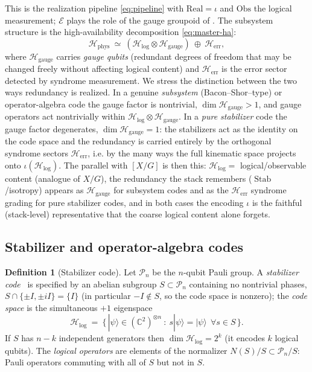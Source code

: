\documentclass[12pt]{article}
\theoremstyle{definition}
\newtheorem{definition}[theorem]{Definition}
\theoremstyle{remark}
\newcommand{\Ho}{\mathcal{H}}
\newcommand{\Hphys}{\Ho_{\mathrm{phys}}}
\newcommand{\Hlog}{\Ho_{\mathrm{log}}}
\newcommand{\Hgauge}{\Ho_{\mathrm{gauge}}}
\newcommand{\Herr}{\Ho_{\mathrm{err}}}
\newcommand{\Real}{\mathrm{Real}}
\newcommand{\Obs}{\mathrm{Obs}}
\newcommand{\Stab}{\operatorname{Stab}}
\newcommand{\quot}[2]{[#1/#2]}
\newcommand{\Pauli}{\mathcal{P}}
\newcommand{\CC}{\mathbb{C}}
\begin{document}
This is the realization pipeline \eqref{eq:pipeline} with $\Real=\iota$ and $\Obs$ the
logical measurement; $\mathcal E$ plays the role of the gauge groupoid of
. The subsystem structure is the high-availability decomposition
\eqref{eq:master-ha}:
\begin{equation}
\Hphys\ \simeq\ (\Hlog\otimes\Hgauge)\ \oplus\ \Herr,
\label{eq:subsystem}
\end{equation}
where $\Hgauge$ carries \emph{gauge qubits} (redundant degrees of freedom that may be
changed freely without affecting logical content) and $\Herr$ is the error sector
detected by syndrome measurement. We stress the distinction between the two ways
redundancy is realized. In a genuine \emph{subsystem} (Bacon--Shor--type) or
operator-algebra code the gauge factor is nontrivial, $\dim\Hgauge>1$, and gauge
operators act nontrivially within $\Hlog\otimes\Hgauge$. In a \emph{pure stabilizer}
code the gauge factor degenerates, $\dim\Hgauge=1$: the stabilizers act as the identity
on the code space and the redundancy is carried entirely by the orthogonal syndrome
sectors $\Herr$, i.e. by the many ways the full kinematic space projects onto
$\iota(\Hlog)$. The parallel with $\quot{X}{G}$ is then this: $\Hlog=$ logical/observable
content (analogue of $X/G$), the redundancy the stack remembers ($\Stab$/isotropy)
appears as $\Hgauge$ for subsystem codes and as the $\Herr$ syndrome grading for pure
stabilizer codes, and in both cases the encoding $\iota$ is the faithful (stack-level)
representative that the coarse logical content alone forgets.

\subsection{Stabilizer and operator-algebra codes}

\begin{definition}[Stabilizer code]
\label{def:stabilizer}
Let $\Pauli_n$ be the $n$-qubit Pauli group. A \emph{stabilizer code}~\cite{Gottesman} is
specified by an abelian subgroup $S\subset\Pauli_n$ containing no nontrivial phases,
$S\cap\{\pm I,\pm iI\}=\{I\}$ (in particular $-I\notin S$, so the code space is
nonzero); the \emph{code space} is the simultaneous $+1$ eigenspace
\begin{equation}
\Hlog\ =\ \{\,|\psi\rangle\in(\CC^2)^{\otimes n}\ :\ s|\psi\rangle=|\psi\rangle\ \ \forall
s\in S\,\}.
\label{eq:code-space}
\end{equation}
If $S$ has $n-k$ independent generators then $\dim\Hlog=2^{k}$ (it encodes $k$ logical
qubits). The \emph{logical operators} are elements of the normalizer
$N(S)/S\subset\Pauli_n/S$: Pauli operators commuting with all of $S$ but not in $S$.
\end{definition}
\end{document}
